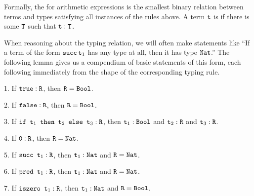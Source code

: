 \documentclass[11pt,twoside=off,numbers=noenddot]{scrbook}
\begin{document}
\begin{prooftree}
\end{prooftree}

\begin{prooftree}
\end{prooftree}

\begin{prooftree}
\end{prooftree}

\begin{prooftree}
\end{prooftree}

\begin{definition}
  Formally, the  for arithmetic expressions is
  the smallest binary relation between terms and types satisfying all
  instances of the rules above. A term $\ttt{t}$ is  if there is some $\ttt{T}$ such that $\ttt{t} : \ttt{T}$.
\end{definition}

When reasoning about the typing relation, we will often make
statements like ``If a term of the form $\ttt{succ\,$\ttt{t}_1$}$ has
any type at all, then it has type $\ttt{Nat}$.'' The following lemma
gives us a compendium of basic statements of this form, each
following immediately from the shape of the corresponding typing rule.

\begin{lemma}
  1. If $\ttt{true} : \ttt{R}$, then $\ttt{R} = \ttt{Bool}$.

  2. If $\ttt{false} : \ttt{R}$, then $\ttt{R} = \ttt{Bool}$.

  3. If $\ttt{if $\ttt{t}_1$ then $\ttt{t}_2$ else $\ttt{t}_3$} :
  \ttt{R}$, then $\ttt{t}_1 : \ttt{Bool}$ and $\ttt{t}_2 : \ttt{R}$
  and $\ttt{t}_3 : \ttt{R}$.

  4. If $\ttt{0} : \ttt{R}$, then $\ttt{R} = \ttt{Nat}$.

  5. If $\ttt{succ $\ttt{t}_1$} : \ttt{R}$, then $\ttt{t}_1 :
  \ttt{Nat}$ and $\ttt{R} = \ttt{Nat}$.

  6. If $\ttt{pred $\ttt{t}_1$} : \ttt{R}$, then $\ttt{t}_1 :
  \ttt{Nat}$ and $\ttt{R} = \ttt{Nat}$.

  7. If $\ttt{iszero $\ttt{t}_1$} : \ttt{R}$, then $\ttt{t}_1 :
  \ttt{Nat}$ and $\ttt{R} = \ttt{Bool}$.
\end{lemma}
\end{document}
